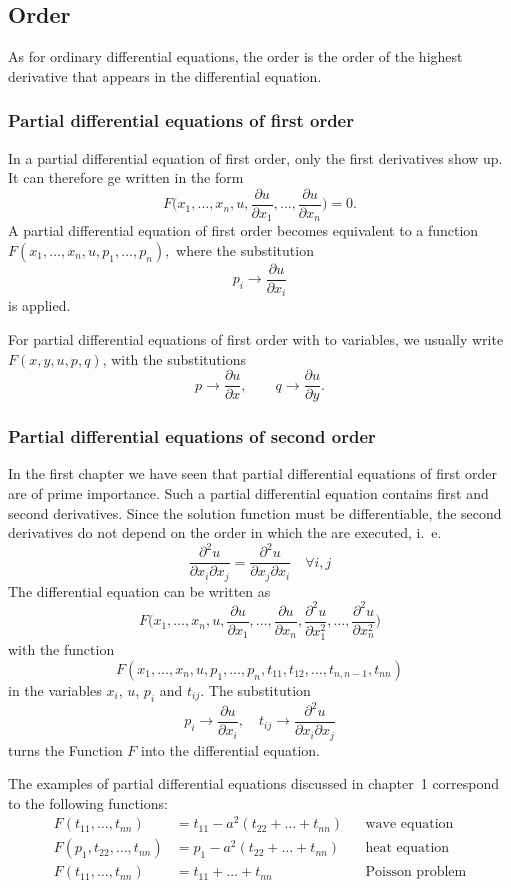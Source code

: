 \subsection{Order\label{klassifikation:ordnung}}
As for ordinary differential equations, the order is the order of the
highest derivative that appears in the differential equation.

\subsubsection{Partial differential equations of first order}
In a partial differential equation of first order, only the first derivatives
show up.
It can therefore ge written in the form
\[
F\biggl(x_1,\dots,x_n, u, \frac{\partial u}{\partial x_1},\dots,\frac{\partial u}{\partial x_n}\biggr)=0.
\]
A partial differential equation of first order becomes equivalent to
a function
$F(x_1,\dots,x_n,u,p_1,\dots,p_n),$
where the substitution
\[
p_i\to \frac{\partial u}{\partial x_i}
\]
is applied.

For partial differential equations of first order with to variables,
we usually write
$F(x,y,u,p,q)$,
with the substitutions
\[
p\to\frac{\partial u}{\partial x},
\qquad
q\to\frac{\partial u}{\partial y}.
\]

\subsubsection{Partial differential equations of second order}
In the first chapter we have seen that partial differential equations of
first order are of prime importance.
Such a partial differential equation contains first and second derivatives.
Since the solution function must be differentiable, the second derivatives
do not depend on the order in which the are executed, i.~e.
\[
\frac{\partial^2 u}{\partial x_i\partial x_j}
=
\frac{\partial^2 u}{\partial x_j\partial x_i}
\quad\forall i,j
\]
The differential equation can be written as
\[
F\biggl(x_1,\dots,x_n,u,
\frac{\partial u}{\partial x_1},\dots,\frac{\partial u}{\partial x_n},
\frac{\partial^2 u}{\partial x_1^2},\dots,\frac{\partial^2 u}{\partial x_n^2}\biggr)
\]
with the function
\[
F(x_1,\dots,x_n,u,p_1,\dots,p_n,t_{11},t_{12},\dots,t_{n,n-1},t_{nn})
\]
in the variables $x_i$, $u$, $p_i$ and $t_{ij}$.
The substitution
\[
p_i\to \frac{\partial u}{\partial x_i}
,\quad
t_{ij}\to \frac{\partial^2 u}{\partial x_i\partial x_j}
\]
turns the Function $F$ into the differential equation.

The examples of partial differential equations discussed in chapter~1
correspond to the following functions:
\begin{align*}
F(t_{11},\dots,t_{nn})&=t_{11}-a^2(t_{22}+\dots+t_{nn})&&\text{wave equation}
\\
F(p_1,t_{22},\dots,t_{nn})&=p_1-a^2(t_{22}+\dots+t_{nn})&&\text{heat equation}
\\
F(t_{11},\dots,t_{nn})&=t_{11}+\dots+t_{nn}&&\text{Poisson problem}
\end{align*}

